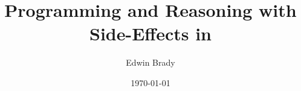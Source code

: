 \usepackage[l2tabu,orthodox]{nag}
\usepackage{fixltx2e}
\usepackage{babel}
\usepackage[iso]{isodate}
\usepackage[utf8]{inputenc}
\usepackage[T1]{fontenc}
\usepackage[protrusion=true, expansion=true]{microtype}
\usepackage[strict=true]{csquotes}
\usepackage{xspace}

\usepackage{mathpazo}
\usepackage[scaled=0.95]{helvet}
\usepackage{courier}

\usepackage[bookmarks]{hyperref}
\usepackage[missing=0.9.14]{gitinfo}

\usepackage{multicol}
\usepackage{enumitem}

\usepackage{fpmacros}
\usepackage{idrislang}
\usepackage{comment}
\usepackage{graphicx}




\newcommand{\version}{\gitVtagn}
\newcommand{\effects}{\texttt{effects}}

\title{Programming and Reasoning with Side-Effects in \Idris{}}
\author{Edwin Brady}
\date{\origdate\today}



\maketitle
\tableofcontents
\newpage












\appendix



